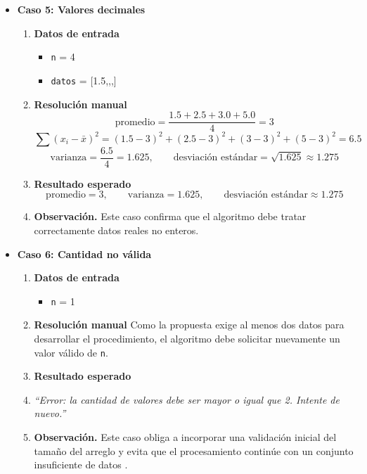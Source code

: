 \documentclass[12pt,twoside]{book}
\begin{document}
\begin{itemize}
						
						\item \textbf{Caso 5: Valores decimales}
						\begin{enumerate}
							\item \textbf{Datos de entrada}
							\begin{itemize}
								\item \texttt{n} = 4
								\item \texttt{datos} = [1.5,,,]
							\end{itemize}
							\item \textbf{Resolución manual}
							\[
							\text{promedio}=\frac{1.5+2.5+3.0+5.0}{4}=3
							\]
							\[
							\sum (x_i-\bar{x})^2 = (1.5-3)^2+(2.5-3)^2+(3-3)^2+(5-3)^2 = 6.5
							\]
							\[
							\text{varianza}=\frac{6.5}{4}=1.625,\qquad
							\text{desviación estándar}=\sqrt{1.625}\approx 1.275
							\]
							\item \textbf{Resultado esperado}
							\[
							\text{promedio}=3,\qquad \text{varianza}=1.625,\qquad \text{desviación estándar}\approx 1.275
							\]
							\item \textbf{Observación.} Este caso confirma que el algoritmo debe tratar correctamente datos reales no enteros.
						\end{enumerate}
						
						
						\item \textbf{Caso 6: Cantidad no válida}
						\begin{enumerate}
							\item \textbf{Datos de entrada}
							\begin{itemize}
								\item \texttt{n} = 1
							\end{itemize}
							\item \textbf{Resolución manual}
							Como la propuesta exige al menos dos datos para desarrollar el procedimiento, el algoritmo debe solicitar nuevamente un valor válido de \texttt{n}.
							\item \textbf{Resultado esperado}
							\item \textit{``Error: la cantidad de valores debe ser mayor o igual que 2. Intente de nuevo.''}
							\item \textbf{Observación.} Este caso obliga a incorporar una validación inicial del tamaño del arreglo y evita que el procesamiento continúe con un conjunto insuficiente de datos \cite{Pressman2019Software,Sommerville2015Software}.
						\end{enumerate}
					\end{itemize}
					
\end{document}
